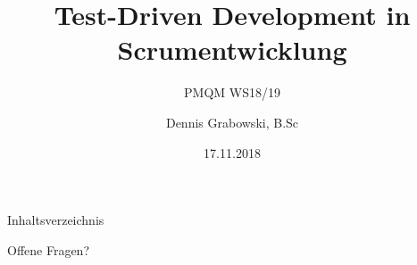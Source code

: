 \documentclass{f4_beamer_metropolis}
\title{Test-Driven Development in Scrumentwicklung}
\subtitle{PMQM WS18/19}
\author{Dennis Grabowski, B.Sc}
\date{17.11.2018}
\begin{document}
\begin{frame}{Inhaltsverzeichnis}
    \tableofcontents[hideallsubsections]
  \end{frame}

\begin{frame}[standout]
  Offene Fragen?
\end{frame}
\end{document}
